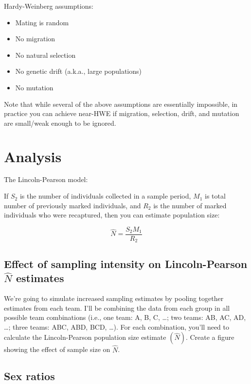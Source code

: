 \documentclass[]{book}
\providecommand{\tightlist}{%
  \setlength{\itemsep}{0pt}\setlength{\parskip}{0pt}}
\begin{document}
Hardy-Weinberg assumptions:

\begin{itemize}
\tightlist
\item
  Mating is random
\item
  No migration
\item
  No natural selection
\item
  No genetic drift (a.k.a., large populations)
\item
  No mutation
\end{itemize}

Note that while several of the above assumptions are essentially
impossible, in practice you can achieve near-HWE if migration,
selection, drift, and mutation are small/weak enough to be ignored.

\section{Analysis}\label{analysis-1}

The Lincoln-Pearson model:

If \(S_2\) is the number of individuals collected in a sample period,
\(M_1\) is total number of previously marked individuals, and \(R_2\) is
the number of marked individuals who were recaptured, then you can
estimate population size:

\[\hat{N} = \frac{S_2 M_1}{R_2}\]

\subsection{\texorpdfstring{Effect of sampling intensity on
Lincoln-Pearson \(\hat{N}\)
estimates}{Effect of sampling intensity on Lincoln-Pearson \textbackslash{}hat\{N\} estimates}}\label{effect-of-sampling-intensity-on-lincoln-pearson-hatn-estimates}

We're going to simulate increased sampling estimates by pooling together
estimates from each team. I'll be combining the data from each group in
all possible team combinations (i.e., one team: A, B, C, \ldots{}; two
teams: AB, AC, AD, \ldots{}; three teams: ABC, ABD, BCD, \ldots{}). For
each combination, you'll need to calculate the Lincoln-Pearson
population size estimate \((\hat{N})\). Create a figure showing the
effect of sample size on \(\hat{N}\).

\subsection{Sex ratios}\label{sex-ratios}
\end{document}
